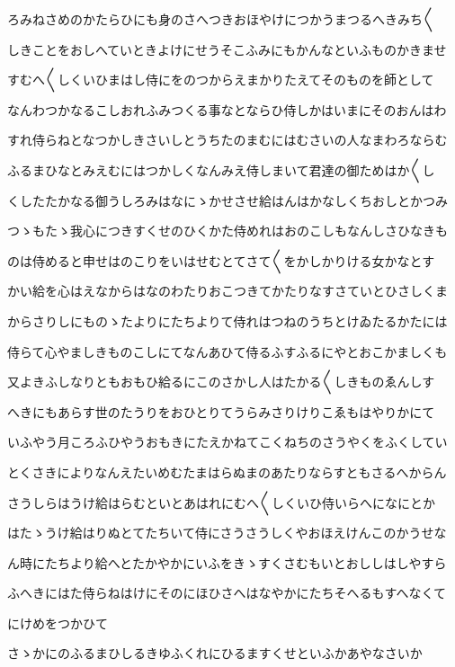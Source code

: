 \documentclass[a4paper,11pt,landscape]{ltjtarticle}
\begin{document}
\par\medskip
ろみねさめのかたらひにも身のさへつきおほやけにつかうまつるへきみち〱
\par\medskip
しきことをおしへていときよけにせうそこふみにもかんなといふものかきませ
\par\medskip
すむへ〱しくいひまはし侍にをのつからえまかりたえてそのものを師として
\par\medskip
なんわつかなるこしおれふみつくる事なとならひ侍しかはいまにそのおんはわ
\par\medskip
すれ侍らねとなつかしきさいしとうちたのまむにはむさいの人なまわろならむ
\par\medskip
ふるまひなとみえむにはつかしくなんみえ侍しまいて君達の御ためはか〱し
\par\medskip
くしたたかなる御うしろみはなにゝかせさせ給はんはかなしくちおしとかつみ
\par\medskip
つゝもたゝ我心につきすくせのひくかた侍めれはおのこしもなんしさひなきも
\par\medskip
のは侍めると申せはのこりをいはせむとてさて〱をかしかりける女かなとす
\par\medskip
かい給を心はえなからはなのわたりおこつきてかたりなすさていとひさしくま
\par\medskip
からさりしにものゝたよりにたちよりて侍れはつねのうちとけゐたるかたには
\par\medskip
侍らて心やましきものこしにてなんあひて侍るふすふるにやとおこかましくも
\par\medskip
又よきふしなりともおもひ給るにこのさかし人はたかる〱しきものゑんしす
\par\medskip
へきにもあらす世のたうりをおひとりてうらみさりけりこゑもはやりかにて
\par\medskip
いふやう月ころふひやうおもきにたえかねてこくねちのさうやくをふくしてい
\par\medskip
とくさきによりなんえたいめむたまはらぬまのあたりならすともさるへからん
\par\medskip
さうしらはうけ給はらむといとあはれにむへ〱しくいひ侍いらへになにとか
\par\medskip
はたゝうけ給はりぬとてたちいて侍にさうさうしくやおほえけんこのかうせな
\par\medskip
ん時にたちより給へとたかやかにいふをきゝすくさむもいとおししはしやすら
\par\medskip
ふへきにはた侍らねはけにそのにほひさへはなやかにたちそへるもすへなくて
\par\medskip
にけめをつかひて
\par\medskip
さゝかにのふるまひしるきゆふくれにひるますくせといふかあやなさいか
\end{document}
